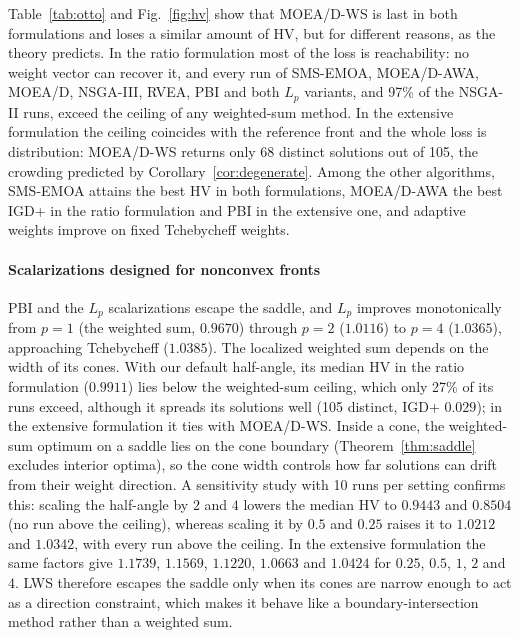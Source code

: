 \documentclass[journal]{IEEEtran}
\theoremstyle{remark}
\begin{document}
Table~\ref{tab:otto} and Fig.~\ref{fig:hv} show that MOEA/D-WS is last in both formulations and loses a
similar amount of HV, but for different reasons, as the theory predicts. In the ratio formulation
most of the loss is reachability: no weight vector can recover it, and every run of SMS-EMOA, MOEA/D-AWA,
MOEA/D, NSGA-III, RVEA, PBI and both $L_p$ variants, and 97\% of the NSGA-II runs, exceed the ceiling of
any weighted-sum method. In the extensive formulation the ceiling coincides with the reference front and
the whole loss is distribution: MOEA/D-WS returns only 68 distinct solutions out of 105, the crowding
predicted by Corollary~\ref{cor:degenerate}. Among the other algorithms, SMS-EMOA attains the best HV in
both formulations, MOEA/D-AWA the best IGD+ in the ratio formulation and PBI in the extensive one, and
adaptive weights improve on fixed Tchebycheff weights.

\paragraph*{Scalarizations designed for nonconvex fronts} PBI and the $L_p$ scalarizations escape the
saddle, and $L_p$ improves monotonically from $p = 1$ (the weighted sum, $0.9670$) through $p = 2$
($1.0116$) to $p = 4$ ($1.0365$), approaching Tchebycheff ($1.0385$). The localized weighted sum depends on the width of its cones. With our default half-angle, its median HV
in the ratio formulation ($0.9911$) lies below the weighted-sum ceiling, which only 27\% of its runs
exceed, although it spreads its solutions well (105 distinct, IGD+ $0.029$); in the extensive formulation
it ties with MOEA/D-WS. Inside a cone, the weighted-sum optimum on a saddle lies on the cone boundary
(Theorem~\ref{thm:saddle} excludes interior optima), so the cone width controls how far solutions can
drift from their weight direction. A sensitivity study with 10 runs per setting confirms this: scaling
the half-angle by $2$ and $4$ lowers the median HV to $0.9443$ and $0.8504$ (no run above the ceiling),
whereas scaling it by $0.5$ and $0.25$ raises it to $1.0212$ and $1.0342$, with every run above the
ceiling. In the extensive formulation the same factors give $1.1739$, $1.1569$, $1.1220$, $1.0663$ and
$1.0424$ for $0.25$, $0.5$, $1$, $2$ and $4$. LWS therefore escapes the saddle only when its cones are
narrow enough to act as a direction constraint, which makes it behave like a boundary-intersection
method rather than a weighted sum.
\end{document}
